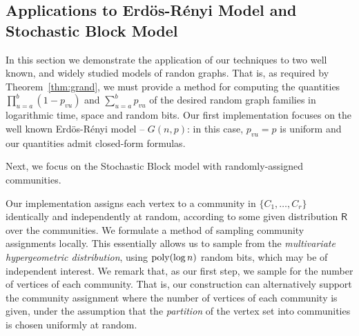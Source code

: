 \subsection{Applications to Erd\"{o}s-R\'{e}nyi Model and Stochastic Block Model}
\label{sec:applications}
In this section we demonstrate the application of our techniques to
two well known, and widely studied models of randon graphs. That is, as required by Theorem~\ref{thm:grand}, we must provide a method for computing the quantities $\prod_{u=a}^b (1-p_{vu})$ and $\sum_{u=a}^b p_{vu}$ of the desired random graph families in logarithmic time, space and random bits.
Our first implementation focuses on the well known Erd\"{o}s-R\'{e}nyi model -- $G(n,p)$: in this case, $p_{vu} = p$ is uniform and our quantities admit closed-form formulas.

Next, we focus on the Stochastic Block model with randomly-assigned communities.
\iffalse
{\color{red}In this case, a naive solution would be to simply assign communities to contiguous blocks of indices.
In such a setting, the problem of calculating $\mathsf{F}(v,a,b)$, simply reduces to the $G(n,p)$ case,
with some additional case analysis to check when we are at a community boundary.
However, this setup is unrealistic,
and not particularly useful in the context of the Stochastic Block model.
In fact most algorithms operating on these graphs,
are trying to unveil the underlying community structure.}
{\color{blue} I'd say these motivations should show up in intro or preliminaries (for the full version)}
\fi
Our implementation assigns each vertex to a community in $\{C_1, \ldots, C_r\}$ identically and independently at random, according to some given distribution $\mathsf{R}$ over the communities. We formulate a method of sampling community assignments locally.
This essentially allows us to sample from the \emph{multivariate hypergeometric distribution},
using $\mathrm{poly}(\log n)$ random bits, which may be of independent interest. We remark that, as our first step, we sample for the number of vertices of each community. That is, our construction can alternatively support the community assignment where the number of vertices of each community is given, under the assumption that the \emph{partition} of the vertex set into communities is chosen uniformly at random.

